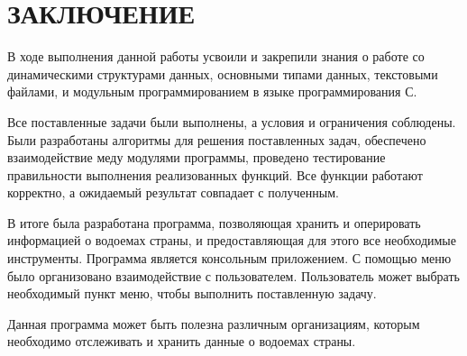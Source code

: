 \newpage

\section*{ЗАКЛЮЧЕНИЕ}
{}

В ходе выполнения данной работы усвоили и закрепили знания о работе со динамическими структурами данных, основными типами данных, текстовыми файлами, и модульным программированием в языке программирования С.

Все поставленные задачи были выполнены, а условия и ограничения соблюдены. Были разработаны алгоритмы для решения поставленных задач, обеспечено взаимодействие меду модулями программы, проведено тестирование правильности выполнения реализованных функций. Все функции работают корректно, а ожидаемый результат совпадает с полученным.
	
В итоге была разработана программа, позволяющая хранить и оперировать информацией о водоемах страны, и предоставляющая для этого все необходимые инструменты. Программа является консольным приложением. С помощью меню было организовано взаимодействие с пользователем. Пользователь может выбрать необходимый пункт меню, чтобы выполнить поставленную задачу.

Данная программа может быть полезна различным организациям, которым необходимо отслеживать и хранить данные о водоемах страны.

\newpage